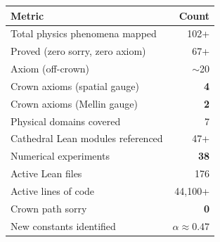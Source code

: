 \documentclass[11pt,a4paper]{article}
\begin{document}
\begin{center}
\begin{tabular}{@{}lr@{}}
\toprule
\textbf{Metric} & \textbf{Count} \\
\midrule
Total physics phenomena mapped & 102+ \\
Proved (zero sorry, zero axiom) & 67+ \\
Axiom (off-crown) & $\sim$20 \\
Crown axioms (spatial gauge) & \textbf{4} \\
Crown axioms (Mellin gauge) & \textbf{2} \\
Physical domains covered & 7 \\
Cathedral Lean modules referenced & 47+ \\
Numerical experiments & \textbf{38} \\
Active Lean files & 176 \\
Active lines of code & 44,100+ \\
Crown path sorry & \textbf{0} \\
New constants identified & \textbf{$\alpha \approx 0.47$} \\
\bottomrule
\end{tabular}
\end{center}
\end{document}
